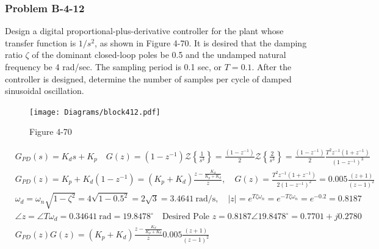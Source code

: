 \subsubsection*{Problem B-4-12}
Design a digital proportional-plus-derivative controller for the plant whose transfer function is $1/s^2$, as shown in Figure 4-70. It is desired that the damping ratio $\zeta$ of the dominant closed-loop poles be 0.5 and the undamped natural frequency be 4 rad/sec. The sampling period is 0.1 sec, or $T=0.1$. After the controller is designed, determine the number of samples per cycle of damped sinusoidal oscillation.
\begin{figure}
	\centering
	\texttt{[image: Diagrams/block412.pdf]}
	\caption*{Figure 4-70}
	\label{fig:blockB4-12}
\end{figure}
\vspace*{-1.05cm}
\begin{align}
&  G_{PD}(s) = K_ds +K_p \quad G(z) = (1-z^{-1}) \mathcal{Z} \left\{\frac{1}{s^3} \right\} = \frac{(1-z^{-1})}{2} \mathcal{Z} \left\{\frac{2}{s^3} \right\} = \frac{(1-z^{-1})}{2} \frac{T^2z^{-1}(1+z^{-1})}{(1-z^{-1})^3} \\
& G_{PD}(z) =K_p+K_d(1-z^{-1})= (K_p+K_d)\frac{z-\frac{K_d}{K_p+K_d}}{z}, \quad G(z)=\frac{T^2z^{-1}(1+z^{-1})}{2(1-z^{-1})^2}=0.005\frac{(z+1)}{(z-1)^2} \\
& \omega_d = \omega_n \sqrt{1-\zeta^2} = 4 \sqrt{1-0.5^2}= 2 \sqrt{3} =3.4641 \ \text{rad/s}, \quad |z| = e^{T \zeta \omega_n} = e^{-T \zeta \omega_n} =e^{-0.2} = 0.8187 \\
& \angle z = \angle T \omega_d = 0.34641 \ \text{rad} =19.8478^\circ \quad  \text{Desired Pole } z = 0.8187 \angle 19.8478^\circ =0.7701+j0.2780 \\
& G_{PD}(z)G(z)= (K_p+K_d)\frac{z-\frac{K_d}{K_p+K_d}}{z}0.005\frac{(z+1)}{(z-1)^2}
\end{align}

